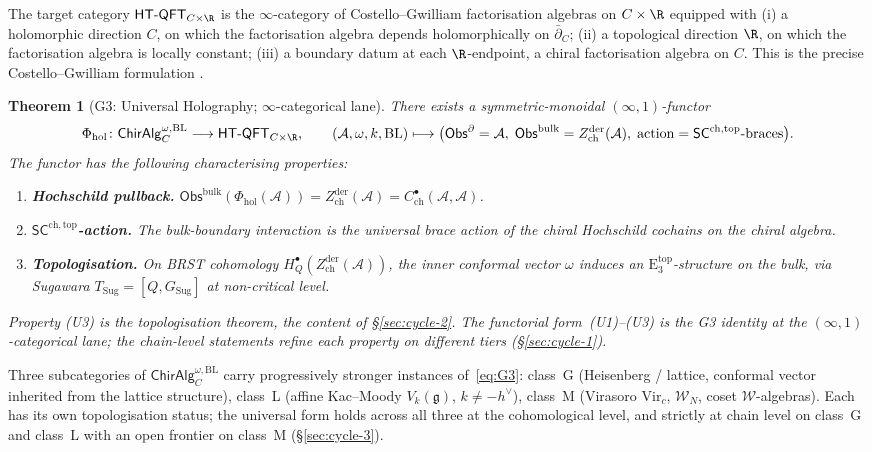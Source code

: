 \documentclass{article}
\newtheorem{theorem}{Theorem}[section]
\theoremstyle{definition}
\theoremstyle{remark}
\newcommand{\SCchtop}{\mathsf{SC}^{\mathrm{ch,top}}}
\newcommand{\Phihol}{\Phi_{\mathrm{hol}}}
\newcommand{\HTQFT}{\mathsf{HT\text{-}QFT}}
\newcommand{\ChirAlg}{\mathsf{ChirAlg}}
\newcommand{\Obs}{\mathsf{Obs}}
\newcommand{\Zder}{Z^{\mathrm{der}}_{\mathrm{ch}}}
\newcommand{\ChirHoch}{C^{\bullet}_{\mathrm{ch}}}
\newcommand{\Etop}[1]{\mathrm{E}_{#1}^{\mathrm{top}}}
\newcommand{\fg}{\mathfrak{g}}
\newcommand{\Vir}{\mathrm{Vir}}
\newcommand{\cW}{\mathcal{W}}
\newcommand{\cA}{\mathcal{A}}
\newcommand{\Sug}{T_{\mathrm{Sug}}}
\newcommand{\Gsug}{G_{\mathrm{Sug}}}
\newcommand{\hv}{h^{\vee}}
\begin{document}
The target category $\HTQFT_{C\times\R}$ is the
$\infty$-category of Costello--Gwilliam factorisation algebras on
$C\times\R$ equipped with (i) a holomorphic direction $C$, on which
the factorisation algebra depends holomorphically on $\bar\partial_C$;
(ii) a topological direction $\R$, on which the factorisation
algebra is locally constant; (iii) a boundary datum at each
$\R$-endpoint, a chiral factorisation algebra on $C$. This is the
precise Costello--Gwilliam formulation \cite[Vol.~I, Ch.~5]{CG}.

\begin{theorem}[G3: Universal Holography; \(\infty\)-categorical
lane]\label{thm:G3-functor}
There exists a symmetric-monoidal $(\infty,1)$-functor
\begin{equation}\label{eq:G3}
 \Phihol\colon \ChirAlg^{\omega,\mathrm{BL}}_C
 \longrightarrow \HTQFT_{C\times\R},
 \qquad
 (\cA,\omega,k,\mathrm{BL}) \longmapsto
 \bigl(\Obs^{\partial} = \cA,\;\Obs^{\mathrm{bulk}} = \Zder(\cA),\;
 \mathrm{action} = \SCchtop{\text{-braces}}\bigr).
\end{equation}
The functor has the following characterising properties:
\begin{enumerate}[label=\textup{(U\arabic*)}]
\item \textbf{Hochschild pullback.} $\Obs^{\mathrm{bulk}}(\Phihol(\cA))
 = \Zder(\cA) = \ChirHoch(\cA, \cA)$.
\item \textbf{$\SCchtop$-action.} The bulk-boundary interaction is
 the universal brace action of the chiral Hochschild cochains on
 the chiral algebra.
\item \textbf{Topologisation.} On BRST cohomology
 $H^{\bullet}_{Q}(\Zder(\cA))$, the inner conformal vector
 $\omega$ induces an $\Etop{3}$-structure on the bulk, via
 Sugawara $\Sug = [Q, \Gsug]$ at non-critical level.
\end{enumerate}
Property (U3) is the topologisation theorem, the content of
\S\ref{sec:cycle-2}. The functorial form~(U1)--(U3) is the G3
identity at the $(\infty,1)$-categorical lane; the chain-level
statements refine each property on different tiers
(\S\ref{sec:cycle-1}).
\end{theorem}

Three subcategories of $\ChirAlg^{\omega,\mathrm{BL}}_C$ carry
progressively stronger instances of~\eqref{eq:G3}:
class~G (Heisenberg / lattice, conformal vector inherited from the
lattice structure), class~L (affine Kac--Moody $V_k(\fg)$, $k\neq
-\hv$), class~M (Virasoro $\Vir_c$, $\cW_N$, coset $\cW$-algebras).
Each has its own topologisation status; the universal form holds
across all three at the cohomological level, and strictly at chain
level on class~G and class~L with an open frontier on class~M
(\S\ref{sec:cycle-3}).
\end{document}
